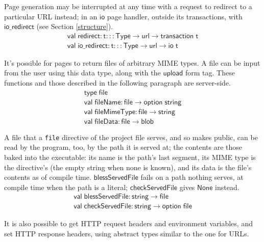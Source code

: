 \documentclass{article}
\newcommand{\mt}[1]{\mathsf{#1}}
\begin{document}
Page generation may be interrupted at any time with a request to redirect to a particular URL instead; in an $\mt{io}$ page handler, outside its transactions, with $\mt{io\_redirect}$ (see Section \ref{structure}).
$$\begin{array}{l}
  \mt{val} \; \mt{redirect} : \mt{t} ::: \mt{Type} \to \mt{url} \to \mt{transaction} \; \mt{t} \\
  \mt{val} \; \mt{io\_redirect} : \mt{t} ::: \mt{Type} \to \mt{url} \to \mt{io} \; \mt{t}
\end{array}$$

It's possible for pages to return files of arbitrary MIME types.  A file can be input from the user using this data type, along with the $\mt{upload}$ form tag.  These functions and those described in the following paragraph are server-side.
$$\begin{array}{l}
  \mt{type} \; \mt{file} \\
  \mt{val} \; \mt{fileName} : \mt{file} \to \mt{option} \; \mt{string} \\
  \mt{val} \; \mt{fileMimeType} : \mt{file} \to \mt{string} \\
  \mt{val} \; \mt{fileData} : \mt{file} \to \mt{blob}
\end{array}$$

A file that a \texttt{file} directive of the project file serves, and so makes public, can be read by the program, too, by the path it is served at; the contents are those baked into the executable: its name is the path's last segment, its MIME type is the directive's (the empty string when none is known), and its data is the file's contents as of compile time.  $\mt{blessServedFile}$ fails on a path nothing serves, at compile time when the path is a literal; $\mt{checkServedFile}$ gives $\mt{None}$ instead.
$$\begin{array}{l}
  \mt{val} \; \mt{blessServedFile} : \mt{string} \to \mt{file} \\
  \mt{val} \; \mt{checkServedFile} : \mt{string} \to \mt{option} \; \mt{file}
\end{array}$$

It is also possible to get HTTP request headers and environment variables, and set HTTP response headers, using abstract types similar to the one for URLs.
\end{document}
